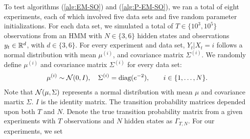 
To test algorithms (\ref{alg:EM-SO}) and (\ref{alg:P-EM-SO}), we ran a total of eight experiments, each of which involved five data sets and five random parameter initializations. For each data set, we simulated a total of $T \in \{10^3,10^5\}$ observations from an HMM with $N \in \{3,6\}$ hidden states and observations $y_t \in \mathbb{R}^d$, with $d \in \{3,6\}$. For every experiment and data set, $Y_t | X_t = i$ follows a normal distribution with mean $\mu^{(i)}$, and covariance matrix $\Sigma^{(i)}$. We randomly define $\mu^{(i)}$ and covariance matrix $\Sigma^{(i)}$ for every data set:
%
\begin{equation*}
    \mu^{(i)} \sim \mathcal{N}(0,I), \quad \Sigma^{(i)} = \text{diag}(e^{-2}), \qquad i \in \{1,\ldots,N\}.
\end{equation*}
%
Note that $\mathcal{N}(\mu,\Sigma)$ represents a normal distribution with mean $\mu$ and covariance martix $\Sigma$. $I$ is the identity matrix.
%
The transition probability matrices depended upon both $T$ and $N$. Denote the true transition probability matrix from a given experiments with $T$ observations and $N$ hidden states as $\Gamma_{T,N}$. For our experiments, we set
%

